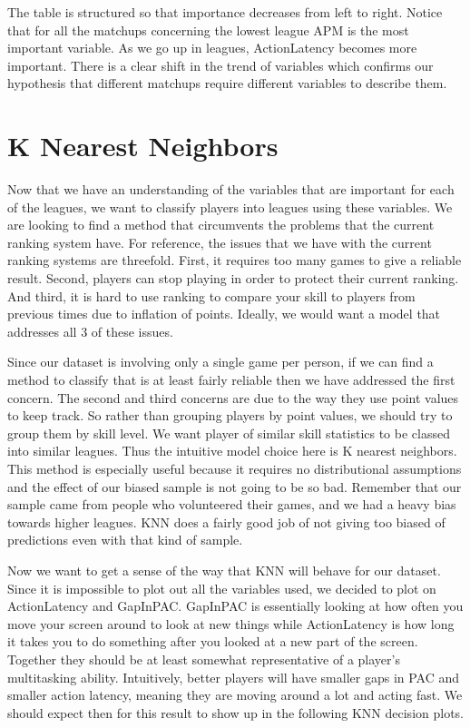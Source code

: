 \documentclass[letterpaper,10pt,english]{/usr/share/sphinx/texinputs/sphinxhowto}
\begin{document}
        
    
The table is structured so that importance decreases from left to right.
Notice that for all the matchups concerning the lowest league APM is the
most important variable. As we go up in leagues, ActionLatency becomes
more important. There is a clear shift in the trend of variables which
confirms our hypothesis that different matchups require different
variables to describe them.\part{K Nearest Neighbors}Now that we have an understanding of the variables that are important
for each of the leagues, we want to classify players into leagues using
these variables. We are looking to find a method that circumvents the
problems that the current ranking system have. For reference, the issues
that we have with the current ranking systems are threefold. First, it
requires too many games to give a reliable result. Second, players can
stop playing in order to protect their current ranking. And third, it is
hard to use ranking to compare your skill to players from previous times
due to inflation of points. Ideally, we would want a model that
addresses all 3 of these issues.

Since our dataset is involving only a single game per person, if we can
find a method to classify that is at least fairly reliable then we have
addressed the first concern. The second and third concerns are due to
the way they use point values to keep track. So rather than grouping
players by point values, we should try to group them by skill level. We
want player of similar skill statistics to be classed into similar
leagues. Thus the intuitive model choice here is K nearest neighbors.
This method is especially useful because it requires no distributional
assumptions and the effect of our biased sample is not going to be so
bad. Remember that our sample came from people who volunteered their
games, and we had a heavy bias towards higher leagues. KNN does a fairly
good job of not giving too biased of predictions even with that kind of
sample.

Now we want to get a sense of the way that KNN will behave for our
dataset. Since it is impossible to plot out all the variables used, we
decided to plot on ActionLatency and GapInPAC. GapInPAC is essentially
looking at how often you move your screen around to look at new things
while ActionLatency is how long it takes you to do something after you
looked at a new part of the screen. Together they should be at least
somewhat representative of a player's multitasking ability. Intuitively,
better players will have smaller gaps in PAC and smaller action latency,
meaning they are moving around a lot and acting fast. We should expect
then for this result to show up in the following KNN decision plots.
\end{document}
